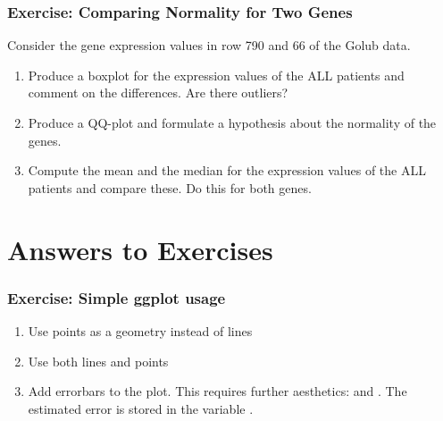 \documentclass{article}\usepackage[]{graphicx}\usepackage[usenames,dvipsnames]{color}
\begin{document}
\subsubsection*{Exercise: Comparing Normality for Two Genes} 
Consider the gene expression values in row 790 and 66 of the Golub data.

\begin{enumerate}[label=(\emph{\alph*})] 
 \item Produce a boxplot for the expression values of the ALL patients
and comment on the differences. Are there outliers?
\item Produce a QQ-plot and formulate a hypothesis about the normality of the genes.
 \item Compute the mean and the median for the expression values of
the ALL patients and compare these. Do this for both genes.
\end{enumerate}





\section{Answers to Exercises}

\subsubsection*{Exercise: Simple ggplot usage }
\begin{enumerate}[label=(\emph{\alph*})]

\item Use points as a geometry instead of lines
\item Use both lines and points
\item Add errorbars  to the plot.
This requires  further aesthetics: 
 and . 
The estimated error is stored in the variable .

\end{enumerate}
\end{document}
